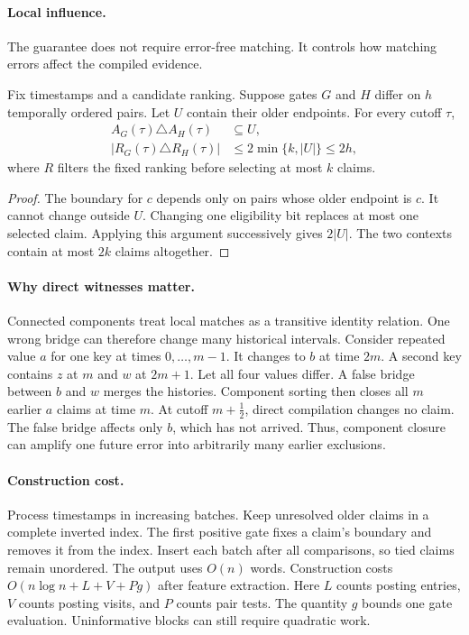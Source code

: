 \paragraph{Local influence.}
The guarantee does not require error-free matching.
It controls how matching errors affect the compiled evidence.

\begin{theorem}
\label{thm:influence}
Fix timestamps and a candidate ranking.
Suppose gates $G$ and $H$ differ on $h$ temporally ordered pairs.
Let $U$ contain their older endpoints.
For every cutoff $\tau$,
\begin{align}
 A_G(\tau)\triangle A_H(\tau)&\subseteq U,\label{eq:mask-influence}\\
 |R_G(\tau)\triangle R_H(\tau)|&\leq2\min\{k,|U|\}\leq2h,
 \label{eq:context-influence}
\end{align}
where $R$ filters the fixed ranking before selecting at most $k$ claims.
\end{theorem}
\begin{proof}
The boundary for $c$ depends only on pairs whose older endpoint is $c$.
It cannot change outside $U$.
Changing one eligibility bit replaces at most one selected claim.
Applying this argument successively gives $2|U|$.
The two contexts contain at most $2k$ claims altogether.
\end{proof}

\paragraph{Why direct witnesses matter.}
Connected components treat local matches as a transitive identity relation.
One wrong bridge can therefore change many historical intervals.
Consider repeated value $a$ for one key at times $0,\ldots,m-1$.
It changes to $b$ at time $2m$.
A second key contains $z$ at $m$ and $w$ at $2m+1$.
Let all four values differ.
A false bridge between $b$ and $w$ merges the histories.
Component sorting then closes all $m$ earlier $a$ claims at time $m$.
At cutoff $m+\tfrac12$, direct compilation changes no claim.
The false bridge affects only $b$, which has not arrived.
Thus, component closure can amplify one future error into arbitrarily many earlier exclusions.

\paragraph{Construction cost.}
Process timestamps in increasing batches.
Keep unresolved older claims in a complete inverted index.
The first positive gate fixes a claim's boundary and removes it from the index.
Insert each batch after all comparisons, so tied claims remain unordered.
The output uses $O(n)$ words.
Construction costs $O(n\log n+L+V+Pg)$ after feature extraction.
Here $L$ counts posting entries, $V$ counts posting visits, and $P$ counts pair tests.
The quantity $g$ bounds one gate evaluation.
Uninformative blocks can still require quadratic work.
